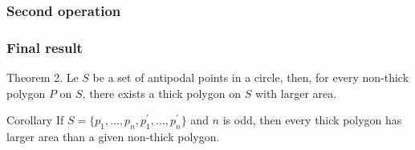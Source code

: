 \documentclass{beamer}
\begin{document}
\begin{frame}
\frametitle{Second operation}

\end{frame}

\begin{frame}
\frametitle{Final result}
\begin{alertblock}{Theorem 2.}
Le $S$ be a set of antipodal points in a circle, then, for every non-thick polygon $P$ on $S$, there exists a thick polygon on $S$ with larger area.
\end{alertblock}\pause
\begin{alertblock}{Corollary}
If $S = \{p_{1},\dots,p_{n},p_{1}^{\prime},\dots,p_{n}^{\prime}\}$ and $n$ is odd, then every thick polygon has larger area than a given non-thick polygon.
\end{alertblock}

\end{frame}
\end{document}
